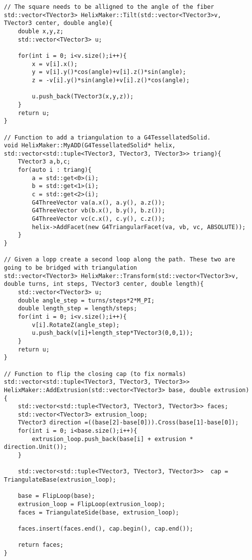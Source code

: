 \begin{lstlisting}
// The square needs to be alligned to the angle of the fiber
std::vector<TVector3> HelixMaker::Tilt(std::vector<TVector3>v,  TVector3 center, double angle){
    double x,y,z;
    std::vector<TVector3> u;

    for(int i = 0; i<v.size();i++){
        x = v[i].x();
        y = v[i].y()*cos(angle)+v[i].z()*sin(angle);
        z = -v[i].y()*sin(angle)+v[i].z()*cos(angle);
             
        u.push_back(TVector3(x,y,z));
    }
    return u;
}

// Function to add a triangulation to a G4TessellatedSolid.
void HelixMaker::MyADD(G4TessellatedSolid* helix, std::vector<std::tuple<TVector3, TVector3, TVector3>> triang){
	TVector3 a,b,c;
	for(auto i : triang){
		a = std::get<0>(i);
		b = std::get<1>(i);
		c = std::get<2>(i);
		G4ThreeVector va(a.x(), a.y(), a.z());
        G4ThreeVector vb(b.x(), b.y(), b.z());
        G4ThreeVector vc(c.x(), c.y(), c.z());
        helix->AddFacet(new G4TriangularFacet(va, vb, vc, ABSOLUTE));
	}
}

// Given a lopp create a second loop along the path. These two are going to be bridged with triangulation
std::vector<TVector3> HelixMaker::Transform(std::vector<TVector3>v, double turns, int steps, TVector3 center, double length){
    std::vector<TVector3> u;
    double angle_step = turns/steps*2*M_PI;
    double length_step = length/steps;
    for(int i = 0; i<v.size();i++){
        v[i].RotateZ(angle_step);
        u.push_back(v[i]+length_step*TVector3(0,0,1));
    }
    return u;
}

// Function to flip the closing cap (to fix normals)
std::vector<std::tuple<TVector3, TVector3, TVector3>> HelixMaker::AddExtrusion(std::vector<TVector3> base, double extrusion){
    std::vector<std::tuple<TVector3, TVector3, TVector3>> faces;
    std::vector<TVector3> extrusion_loop;
    TVector3 direction =((base[2]-base[0])).Cross(base[1]-base[0]);
    for(int i = 0; i<base.size();i++){
        extrusion_loop.push_back(base[i] + extrusion * direction.Unit());
    }

    std::vector<std::tuple<TVector3, TVector3, TVector3>>  cap = TriangulateBase(extrusion_loop);

    base = FlipLoop(base);
    extrusion_loop = FlipLoop(extrusion_loop);
    faces = TriangulateSide(base, extrusion_loop);

    faces.insert(faces.end(), cap.begin(), cap.end());

    return faces;
}

\end{lstlisting}
